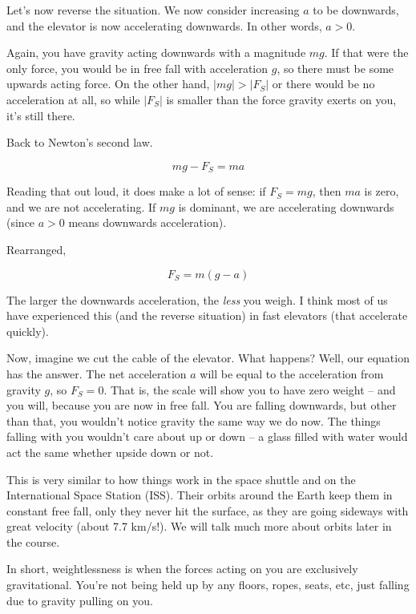 Let's now reverse the situation. We now consider increasing $a$ to be downwards, and the elevator is now accelerating downwards. In other words, $a > 0$.

Again, you have gravity acting downwards with a magnitude $m g$. If that were the only force, you would be in free fall with acceleration $g$, so there must be some upwards acting force. On the other hand, $|m g| > |F_S|$ or there would be no acceleration at all, so while $|F_S|$ is smaller than the force gravity exerts on you, it's still there.

Back to Newton's second law.

\begin{equation}
m g - F_S = m a
\end{equation}

Reading that out loud, it does make a lot of sense: if $F_S = m g$, then $m a$ is zero, and we are not accelerating. If $m g$ is dominant, we are accelerating downwards (since $a > 0$ means downwards acceleration).

Rearranged,

\begin{equation}
F_S = m(g - a)
\end{equation}

The larger the downwards acceleration, the \emph{less} you weigh. I think most of us have experienced this (and the reverse situation) in fast elevators (that accelerate quickly).

Now, imagine we cut the cable of the elevator. What happens? Well, our equation has the answer. The net acceleration $a$ will be equal to the acceleration from gravity $g$, so $F_S = 0$. That is, the scale will show you to have zero weight -- and you will, because you are now in free fall. You are falling downwards, but other than that, you wouldn't notice gravity the same way we do now. The things falling with you wouldn't care about up or down -- a glass filled with water would act the same whether upside down or not.

This is very similar to how things work in the space shuttle and on the International Space Station (ISS). Their orbits around the Earth keep them in constant free fall, only they never hit the surface, as they are going sideways with great velocity (about 7.7 km/s!). We will talk much more about orbits later in the course.

In short, weightlessness is when the forces acting on you are exclusively gravitational. You're not being held up by any floors, ropes, seats, etc, just falling due to gravity pulling on you.


